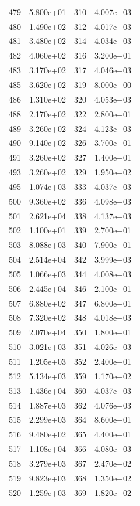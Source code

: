 \documentclass[12pt]{article}
\begin{document}
\begin{longtable}{@{}cccc@{}}
479 & 5.800e+01 & 310 & 4.007e+03 \\
480 & 1.490e+02 & 312 & 4.017e+03 \\
481 & 3.480e+02 & 314 & 4.034e+03 \\
482 & 4.060e+02 & 316 & 3.200e+01 \\
483 & 3.170e+02 & 317 & 4.046e+03 \\
485 & 3.620e+02 & 319 & 8.000e+00 \\
486 & 1.310e+02 & 320 & 4.053e+03 \\
488 & 2.170e+02 & 322 & 2.800e+01 \\
489 & 3.260e+02 & 324 & 4.123e+03 \\
490 & 9.140e+02 & 326 & 3.700e+01 \\
491 & 3.260e+02 & 327 & 1.400e+01 \\
493 & 3.260e+02 & 329 & 1.950e+02 \\
495 & 1.074e+03 & 333 & 4.037e+03 \\
500 & 9.360e+02 & 336 & 4.098e+03 \\
501 & 2.621e+04 & 338 & 4.137e+03 \\
502 & 1.100e+01 & 339 & 2.700e+01 \\
503 & 8.088e+03 & 340 & 7.900e+01 \\
504 & 2.514e+04 & 342 & 3.999e+03 \\
505 & 1.066e+03 & 344 & 4.008e+03 \\
506 & 2.445e+04 & 346 & 2.100e+01 \\
507 & 6.880e+02 & 347 & 6.800e+01 \\
508 & 7.320e+02 & 348 & 4.018e+03 \\
509 & 2.070e+04 & 350 & 1.800e+01 \\
510 & 3.021e+03 & 351 & 4.026e+03 \\
511 & 1.205e+03 & 352 & 2.400e+01 \\
512 & 5.134e+03 & 359 & 1.170e+02 \\
513 & 1.436e+04 & 360 & 4.037e+03 \\
514 & 1.887e+03 & 362 & 4.076e+03 \\
515 & 2.299e+03 & 364 & 8.600e+01 \\
516 & 9.480e+02 & 365 & 4.400e+01 \\
517 & 1.108e+04 & 366 & 4.080e+03 \\
518 & 3.279e+03 & 367 & 2.470e+02 \\
519 & 9.823e+03 & 368 & 1.350e+02 \\
520 & 1.259e+03 & 369 & 1.820e+02 \\

\end{longtable}
\end{document}
